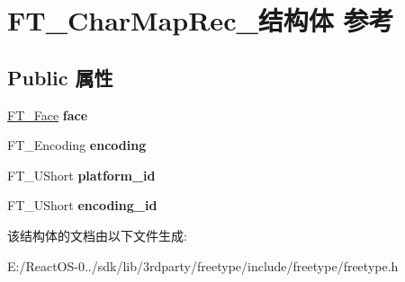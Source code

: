 \hypertarget{struct_f_t___char_map_rec__}{}\section{F\+T\+\_\+\+Char\+Map\+Rec\+\_\+结构体 参考}
\label{struct_f_t___char_map_rec__}
\subsection*{Public 属性}
\begin{DoxyCompactItemize}
\item 
\mbox{\label{struct_f_t___char_map_rec___a70a4e53e3f9818209916e5745c46dc28}} 
\hyperlink{struct_f_t___face_rec__}{F\+T\+\_\+\+Face} {\bfseries face}
\item 
\mbox{\label{struct_f_t___char_map_rec___a88ee6f726ef11a8e6cc793d59ff5557e}} 
F\+T\+\_\+\+Encoding {\bfseries encoding}
\item 
\mbox{\label{struct_f_t___char_map_rec___ae7f439996a8615698e780ce3c4f92457}} 
F\+T\+\_\+\+U\+Short {\bfseries platform\+\_\+id}
\item 
\mbox{\label{struct_f_t___char_map_rec___af10dd43eee8dc93e7d6191c663ae831a}} 
F\+T\+\_\+\+U\+Short {\bfseries encoding\+\_\+id}
\end{DoxyCompactItemize}


该结构体的文档由以下文件生成\+:\begin{DoxyCompactItemize}
\item 
E\+:/\+React\+O\+S-\/0../sdk/lib/3rdparty/freetype/include/freetype/freetype.\+h\end{DoxyCompactItemize}
